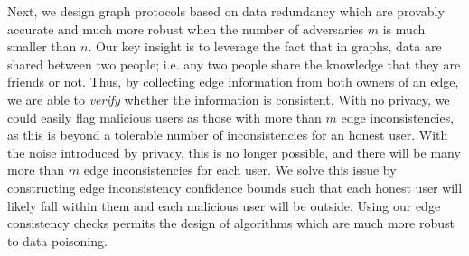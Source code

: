 \begin{comment}\noindent\textbf{Note.} Allour results are attack-agnostic, i.e.,
We reiterate that our correctness and soundness definitions take strict approaches as to what constitutes an ``abnormal'' execution and thus when a protocol is allowed to return $\bottom$. Under correctness, all honest users receive an accurate estimate, regardless of any data poisoning attack. Under soundness, only malicious users who may poison their data are allowed to receive $\bottom$. 

For both correctness and soundness, error terms of $m$ are generally possible against any protocol, as if $m$ users act maliciously, they can corrupt the information of $m$ edges to any user. As described in Section~\ref{sec:price-privacy}, even non-private protocols are susceptible to such attacks. Thus, our correctness and soundness guarantees will all contain terms of $m$---since $m$ is generally small, this term is the lowest-order term in our bounds.

Finally, our definitions are attack-agnostic: an algorithm which is correct or sound up to $m$ malicious users must satisfy the claims regardless of the attack used.
\end{comment}



Next, we design graph protocols based on data redundancy which are provably accurate and much more robust when the number of adversaries $m$ is much smaller than $n$. Our key insight is to leverage the fact that in graphs, data are shared between two people; i.e. any two people share the knowledge that they are friends or not. Thus, by collecting edge information from both owners of an edge, we are able to \emph{verify} whether the information is consistent. With no privacy, we could easily flag malicious users as those with more than $m$ edge inconsistencies, as this is beyond a tolerable number of inconsistencies for an honest user. With the noise introduced by privacy, this is no longer possible, and there will be many more than $m$ edge inconsistencies for each user. We solve this issue by constructing edge inconsistency confidence bounds such that each honest user will likely fall within them and each malicious user will be outside. Using our edge consistency checks permits the design of algorithms which are much more robust to data poisoning.


